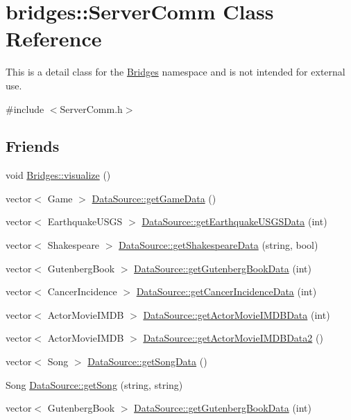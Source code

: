 \hypertarget{classbridges_1_1_server_comm}{}\section{bridges\+:\+:Server\+Comm Class Reference}
\label{classbridges_1_1_server_comm}


This is a detail class for the \mbox{\hyperlink{namespacebridges_1_1_bridges}{Bridges}} namespace and is not intended for external use.  




{\ttfamily \#include $<$Server\+Comm.\+h$>$}

\subsection*{Friends}
\begin{DoxyCompactItemize}
\item 
void \mbox{\hyperlink{classbridges_1_1_server_comm_a0a9e3be9faab475909293766dcda4779}{Bridges\+::visualize}} ()
\item 
vector$<$ Game $>$ \mbox{\hyperlink{classbridges_1_1_server_comm_aaf9715981dcd976f93624bd3aa22183f}{Data\+Source\+::get\+Game\+Data}} ()
\item 
vector$<$ Earthquake\+U\+S\+GS $>$ \mbox{\hyperlink{classbridges_1_1_server_comm_a465a9593399d31b531e61b878a8134b2}{Data\+Source\+::get\+Earthquake\+U\+S\+G\+S\+Data}} (int)
\item 
vector$<$ Shakespeare $>$ \mbox{\hyperlink{classbridges_1_1_server_comm_a1f240eea3d39812606c0b3d10bdc757c}{Data\+Source\+::get\+Shakespeare\+Data}} (string, bool)
\item 
vector$<$ Gutenberg\+Book $>$ \mbox{\hyperlink{classbridges_1_1_server_comm_a8daad6bf2db8bf4f0b0f9914022b6aa4}{Data\+Source\+::get\+Gutenberg\+Book\+Data}} (int)
\item 
vector$<$ Cancer\+Incidence $>$ \mbox{\hyperlink{classbridges_1_1_server_comm_a206da9499372409063d2abe5d1e9bce0}{Data\+Source\+::get\+Cancer\+Incidence\+Data}} (int)
\item 
vector$<$ Actor\+Movie\+I\+M\+DB $>$ \mbox{\hyperlink{classbridges_1_1_server_comm_aeea4f9e05ded118d657ac8ba9e66f22d}{Data\+Source\+::get\+Actor\+Movie\+I\+M\+D\+B\+Data}} (int)
\item 
vector$<$ Actor\+Movie\+I\+M\+DB $>$ \mbox{\hyperlink{classbridges_1_1_server_comm_a19c19c0812754ec276dabbf88d5cedaf}{Data\+Source\+::get\+Actor\+Movie\+I\+M\+D\+B\+Data2}} ()
\item 
vector$<$ Song $>$ \mbox{\hyperlink{classbridges_1_1_server_comm_ada47f365ba4e6c3ef6dbca3afdd20b3f}{Data\+Source\+::get\+Song\+Data}} ()
\item 
Song \mbox{\hyperlink{classbridges_1_1_server_comm_a73eb84d47c0786146b4baceb9d208ea3}{Data\+Source\+::get\+Song}} (string, string)
\item 
vector$<$ Gutenberg\+Book $>$ \mbox{\hyperlink{classbridges_1_1_server_comm_a8daad6bf2db8bf4f0b0f9914022b6aa4}{Data\+Source\+::get\+Gutenberg\+Book\+Data}} (int)
\end{DoxyCompactItemize}


